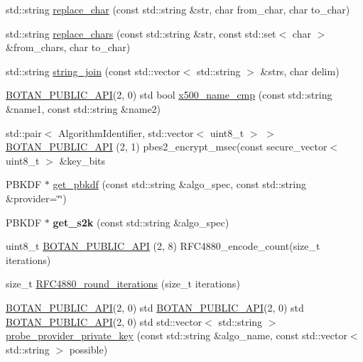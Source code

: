 \begin{DoxyCompactItemize}
\item 
std\+::string \hyperlink{namespace_botan_a292061a5124df501cb59c2f899f78235}{replace\+\_\+char} (const std\+::string \&str, char from\+\_\+char, char to\+\_\+char)
\item 
std\+::string \hyperlink{namespace_botan_ad2a2e4fe6a5a1cdc03f4cf31f39597a3}{replace\+\_\+chars} (const std\+::string \&str, const std\+::set$<$ char $>$ \&from\+\_\+chars, char to\+\_\+char)
\item 
std\+::string \hyperlink{namespace_botan_a8ffe6aa56dd7683af8e6408daf290312}{string\+\_\+join} (const std\+::vector$<$ std\+::string $>$ \&strs, char delim)
\item 
\hyperlink{namespace_botan_a6b9388030d872e586a4655b776ac9501}{B\+O\+T\+A\+N\+\_\+\+P\+U\+B\+L\+I\+C\+\_\+\+A\+PI}(2, 0) std bool \hyperlink{namespace_botan_ae43dddd33284374ef3b8c4e2fe8b8a95}{x500\+\_\+name\+\_\+cmp} (const std\+::string \&name1, const std\+::string \&name2)
\item 
std\+::pair$<$ Algorithm\+Identifier, std\+::vector$<$ uint8\+\_\+t $>$ $>$ \hyperlink{namespace_botan_a8936d9d14b59d25507d664d4e631b605}{B\+O\+T\+A\+N\+\_\+\+P\+U\+B\+L\+I\+C\+\_\+\+A\+PI} (2, 1) pbes2\+\_\+encrypt\+\_\+msec(const secure\+\_\+vector$<$ uint8\+\_\+t $>$ \&key\+\_\+bits
\item 
P\+B\+K\+DF $\ast$ \hyperlink{namespace_botan_a053bdfc377dda32b5d3c116e19c9d394}{get\+\_\+pbkdf} (const std\+::string \&algo\+\_\+spec, const std\+::string \&provider=\char`\"{}\char`\"{})
\item 
\mbox{\label{namespace_botan_a5612cc6316fbfb5d5a5b100c9cf7064e}} 
P\+B\+K\+DF $\ast$ {\bfseries get\+\_\+s2k} (const std\+::string \&algo\+\_\+spec)
\item 
uint8\+\_\+t \hyperlink{namespace_botan_ace7349411411e52a65630e3e607ed504}{B\+O\+T\+A\+N\+\_\+\+P\+U\+B\+L\+I\+C\+\_\+\+A\+PI} (2, 8) R\+F\+C4880\+\_\+encode\+\_\+count(size\+\_\+t iterations)
\item 
size\+\_\+t \hyperlink{namespace_botan_aebdcf273bc754092e425287b1cf05208}{R\+F\+C4880\+\_\+round\+\_\+iterations} (size\+\_\+t iterations)
\item 
\hyperlink{namespace_botan_a6b9388030d872e586a4655b776ac9501}{B\+O\+T\+A\+N\+\_\+\+P\+U\+B\+L\+I\+C\+\_\+\+A\+PI}(2, 0) std \hyperlink{namespace_botan_a6b9388030d872e586a4655b776ac9501}{B\+O\+T\+A\+N\+\_\+\+P\+U\+B\+L\+I\+C\+\_\+\+A\+PI}(2, 0) std \hyperlink{namespace_botan_a6b9388030d872e586a4655b776ac9501}{B\+O\+T\+A\+N\+\_\+\+P\+U\+B\+L\+I\+C\+\_\+\+A\+PI}(2, 0) std std\+::vector$<$ std\+::string $>$ \hyperlink{namespace_botan_a4664d3ac65985ba216d622a84e62c500}{probe\+\_\+provider\+\_\+private\+\_\+key} (const std\+::string \&algo\+\_\+name, const std\+::vector$<$ std\+::string $>$ possible)

\end{DoxyCompactItemize}
